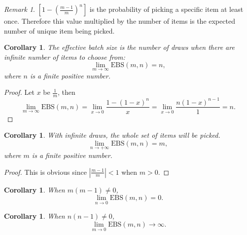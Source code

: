 \documentclass[12pt, letterpaper]{article}
\newcommand{\abs}[1]{\left\lvert #1 \right\rvert}
\newtheorem{cor}[prop]{Corollary}
\theoremstyle{definition}
\theoremstyle{remark}
\newtheorem*{rem*}{Remark}
\newcommand{\EBS}{\mathrm{EBS}}
\begin{document}
	\begin{rem*}
		$\left[1-\left(\frac{m-1}{m}\right)^n\right]$ is the probability of picking a specific item at least once.
		Therefore this value multiplied by the number of items is the expected number of unique item being picked.
	\end{rem*}

	\begin{cor}
		The effective batch size is the number of draws when there are infinite number of items to choose from:
		\begin{equation}
			\lim\limits_{m\to\infty}\EBS(m,n)=n,
		\end{equation}
		where $n$ is a finite positive number.
	\end{cor}

	\begin{proof}
		Let $x$ be $\frac{1}{m}$,
		then
		\begin{equation}
			\lim\limits_{m\to\infty}\EBS(m,n)=\lim\limits_{x\to 0}\frac{1-(1-x)^n}{x}=\lim\limits_{x\to 0}\frac{n(1-x)^{n-1}}{1}=n.
		\end{equation}
	\end{proof}

	\begin{cor}
		With infinite draws, the whole set of items will be picked.
		\begin{equation}
			\lim\limits_{n\to+\infty}\EBS(m,n)=m,
		\end{equation}
		where $m$ is a finite positive number.
	\end{cor}
	\begin{proof}
		This is obvious since $\abs{\frac{m-1}{m}}<1$ when $m>0$.
	\end{proof}

	\begin{cor}
		When $m(m-1)\ne0$,
		\begin{equation}
			\lim\limits_{n\to0}\EBS(m,n)=0.
		\end{equation}
	\end{cor}

	\begin{cor}
		When $n(n-1)\ne0$,
		\begin{equation}
			\lim\limits_{m\to0}\EBS(m,n)\to\infty.
		\end{equation}
	\end{cor}
\end{document}
